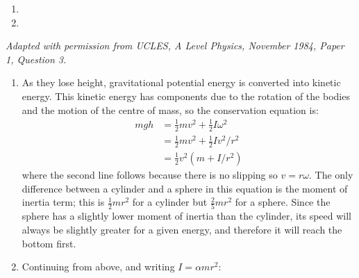 
\begin{hint}
{
\begin{enumerate}
\item {}
\item {}
\end{enumerate}
}
{
{\textit{Adapted with permission from UCLES, A Level Physics, November 1984, Paper 1, Question 3.}}
{\answer[a]{}
\begin{enumerate}
\item
As they lose height, gravitational potential energy is converted into kinetic energy. This kinetic energy has components due to the rotation of the bodies and the motion of the centre of mass, so the conservation equation is:
\begin{align*}
mgh&=\frac{1}{2}mv^2+\frac{1}{2}I\omega^2 \\
&=\frac{1}{2}mv^2+\frac{1}{2}Iv^2/r^2 \\
&=\frac{1}{2}v^2\left(m+I/r^2\right)
\end{align*}
where the second line follows because there is no slipping so $v=r\omega$. The only difference between a cylinder and a sphere in this equation is the moment of inertia term; this is $\frac{1}{2}mr^2$ for a cylinder but $\frac{2}{5}mr^2$ for a sphere. Since the sphere has a slightly lower moment of inertia than the cylinder, its speed will always be slightly greater for a given energy, and therefore it will reach the bottom first.
\item Continuing from above, and writing $I=\alpha mr^2$:
\begin{align*}

\end{align*}
\end{enumerate}}}
\end{hint}
